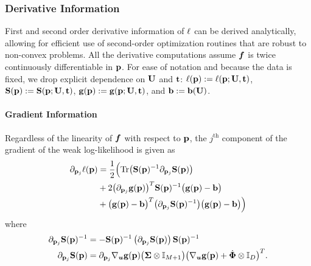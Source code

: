 \subsubsection{Derivative Information}
First and second order derivative information of $\ell$ can be derived analytically, allowing for efficient use of second-order optimization routines that are robust to non-convex problems. All the derivative computations assume $\boldsymbol{f}$ is twice continuously differentiable in $\mathbf{p}$. For ease of notation and because the data is fixed, we drop explicit dependence on $\mathbf{U}$ and $\mathbf{t}$: $\ell(\mathbf{p}) := \ell(\mathbf{p};\mathbf{U},\mathbf{t})$, $\mathbf{S}(\mathbf{p}) := \mathbf{S}(\mathbf{p};\mathbf{U},\mathbf{t})$, $\mathbf{g}(\mathbf{p}) := \mathbf{g}(\mathbf{p};\mathbf{U},\mathbf{t})$, and $\mathbf{b} := \mathbf{b}(\mathbf{U})$.

\paragraph{Gradient Information}

Regardless of the linearity of $\boldsymbol{f}$ with respect to $\mathbf{p}$, the $j^\text{th}$ component of the gradient of the weak log-likelihood is given as 
\begin{equation} \label{eq:wnll-grad}
	\begin{aligned}
		\partial_{\mathbf{p}_j} \ell(\mathbf{p}) &= \frac{1}{2} \Bigl( \operatorname{Tr}\bigl(\mathbf{S}(\mathbf{p})^{-1}\partial_{\mathbf{p}_j}\mathbf{S}(\mathbf{p})\bigr) \\
		&+ 2 \bigl(\partial_{\mathbf{p}_j} \mathbf{g}(\mathbf{p})\bigr)^T \mathbf{S}(\mathbf{p})^{-1} \bigl(\mathbf{g}(\mathbf{p})- \mathbf{b}\bigr) \\
		&+ \bigl(\mathbf{g}(\mathbf{p})-\mathbf{b}\bigr)^T\bigl(\partial_{\mathbf{p}_j} \mathbf{S}(\mathbf{p})^{-1}\bigr)\bigl(\mathbf{g}(\mathbf{p})-\mathbf{b}\bigr)\Bigr)
	\end{aligned}
\end{equation}
where
\begin{align*}
	\partial_{\mathbf{p}_j} \mathbf{S}(\mathbf{p})^{-1} &= -\mathbf{S}(\mathbf{p})^{-1} \left(\partial_{\mathbf{p}_j}\mathbf{S}(\mathbf{p}) \right) \mathbf{S}(\mathbf{p})^{-1}\\
	\partial_{\mathbf{p}_j}\mathbf{S}(\mathbf{p}) &= \partial_{\mathbf{p}_j} \nabla_{\boldsymbol{u}} \mathbf{g}(\mathbf{p}) \bigl(  \mathbf{\Sigma} \otimes \mathbb{I}_{M+1} \bigr)\bigl(\nabla_{\boldsymbol{u}} \mathbf{g}(\mathbf{p}) + \dot{\boldsymbol{\Phi}} \otimes \mathbb{I}_D \bigr)^T.
\end{align*}
